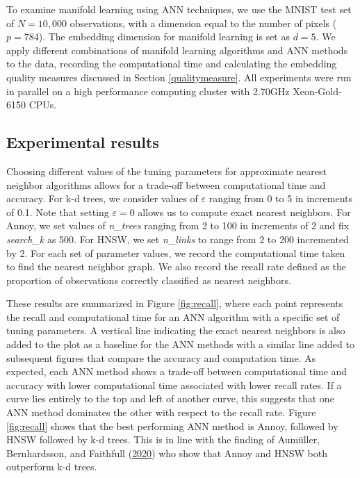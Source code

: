 \documentclass[12pt]{article}
\begin{document}
To examine manifold learning using ANN techniques, we use the MNIST test set of \(N=10,000\) observations, with a dimension equal to the number of pixels (\(p=784\)). The embedding dimension for manifold learning is set as \(d=5\). We apply different combinations of manifold learning algorithms and ANN methods to the data, recording the computational time and calculating the embedding quality measures discussed in Section \ref{qualitymeasure}. All experiments were run in parallel on a high performance computing cluster with 2.70GHz Xeon-Gold-6150 CPUs.

\hypertarget{mnistresults}{%
\subsection{Experimental results}\label{mnistresults}}

Choosing different values of the tuning parameters for approximate nearest neighbor algorithms allows for a trade-off between computational time and accuracy. For k-d trees, we consider values of \(\varepsilon\) ranging from 0 to 5 in increments of 0.1. Note that setting \(\varepsilon=0\) allows us to compute exact nearest neighbors. For Annoy, we set values of \textit{n\_trees} ranging from 2 to 100 in increments of 2 and fix \textit{search\_k} as 500. For HNSW, we set \textit{n\_links} to range from 2 to 200 incremented by 2. For each set of parameter values, we record the computational time taken to find the nearest neighbor graph. We also record the recall rate defined as the proportion of observations correctly classified as nearest neighbors.

These results are summarized in Figure \ref{fig:recall}, where each point represents the recall and computational time for an ANN algorithm with a specific set of tuning parameters.
A vertical line indicating the exact nearest neighbors is also added to the plot as a baseline for the ANN methods with a similar line added to subsequent figures that compare the accuracy and computation time. As expected, each ANN method shows a trade-off between computational time and accuracy with lower computational time associated with lower recall rates. If a curve lies entirely to the top and left of another curve, this suggests that one ANN method dominates the other with respect to the recall rate. Figure \ref{fig:recall} shows that the best performing ANN method is Annoy, followed by HNSW followed by k-d trees. This is in line with the finding of Aumüller, Bernhardsson, and Faithfull (\protect\hyperlink{ref-Aumuller2020-nk}{2020}) who show that Annoy and HNSW both outperform k-d trees.
\end{document}
